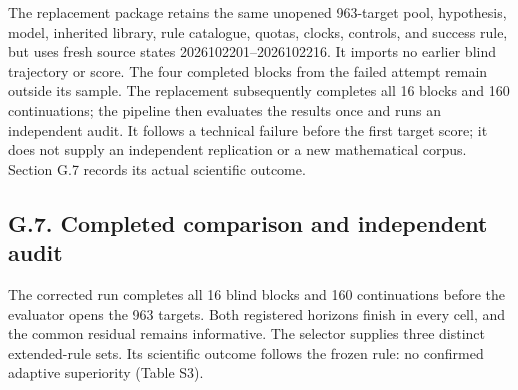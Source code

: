 \documentclass[pdflatex,sn-basic,Numbered]{sn-jnl}
\begin{document}
The replacement package retains the same unopened 963-target pool, hypothesis, model, inherited library, rule catalogue, quotas, clocks, controls, and success rule, but uses fresh source states 2026102201--2026102216. It imports no earlier blind trajectory or score. The four completed blocks from the failed attempt remain outside its sample. The replacement subsequently completes all 16 blocks and 160 continuations; the pipeline then evaluates the results once and runs an independent audit. It follows a technical failure before the first target score; it does not supply an independent replication or a new mathematical corpus. Section G.7 records its actual scientific outcome.

\subsection*{G.7. Completed comparison and independent audit}\label{g.7.-completed-comparison-and-independent-audit}

The corrected run completes all 16 blind blocks and 160 continuations before the evaluator opens the 963 targets. Both registered horizons finish in every cell, and the common residual remains informative. The selector supplies three distinct extended-rule sets. Its scientific outcome follows the frozen rule: no confirmed adaptive superiority (Table S3).

\begingroup
\small
\setlength{\tabcolsep}{3pt}
\renewcommand{\arraystretch}{1.13}
\end{document}
